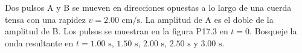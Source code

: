\item Dos pulsos A y B se mueven en direcciones opuestas a lo largo de una cuerda tensa con una rapidez $v = 2.00\text{ cm/s}$. La amplitud de A es el doble de la amplitud de B. Los pulsos se muestran en la figura P17.3 en $t = 0$. Bosqueje la onda resultante en $t = 1.00\text{ s}$, $1.50\text{ s}$, $2.00\text{ s}$, $2.50\text{ s}$ y $3.00\text{ s}$.